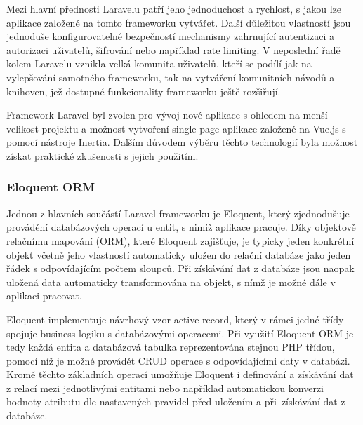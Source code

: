 Mezi hlavní přednosti Laravelu patří jeho jednoduchost a rychlost, s jakou lze aplikace založené na tomto frameworku vytvářet. Další důležitou vlastností jsou jednoduše konfigurovatelné bezpečností mechanismy zahrnující autentizaci a autorizaci uživatelů, šifrování nebo například rate limiting. V neposlední řadě kolem Laravelu vznikla velká komunita uživatelů, kteří se podílí jak na vylepšování samotného frameworku, tak na vytváření komunitních návodů a knihoven, jež dostupné funkcionality frameworku ještě rozšiřují. \cite{laravel-docs, symfony-laravel-comparison-1}

Framework Laravel byl zvolen pro vývoj nové aplikace s ohledem na menší velikost projektu a možnost vytvoření single page aplikace založené na Vue.js s pomocí nástroje Inertia. Dalším důvodem výběru těchto technologií byla možnost získat praktické zkušenosti s jejich použitím.

\subsubsection{Eloquent ORM}
Jednou z hlavních součástí Laravel frameworku je Eloquent, který zjednodušuje provádění databázových operací u entit, s nimiž aplikace pracuje. Díky objektově relačnímu mapování (ORM), které Eloquent zajišťuje, je typicky jeden konkrétní objekt včetně jeho vlastností automaticky uložen do relační databáze jako jeden řádek s odpovídajícím počtem sloupců. Při získávání dat z databáze jsou naopak uložená data automaticky transformována na objekt, s nímž je možné dále v aplikaci pracovat.

Eloquent implementuje návrhový vzor active record, který v rámci jedné třídy spojuje business logiku s databázovými operacemi. Při využití Eloquent ORM je tedy každá entita a databázová tabulka reprezentována stejnou PHP třídou, pomocí níž je možné provádět CRUD operace s odpovídajícími daty v databázi. Kromě těchto základních operací umožňuje Eloquent i definování a získávání dat z relací mezi jednotlivými entitami nebo například automatickou konverzi hodnoty atributu dle nastavených pravidel před uložením a při~získávání dat z databáze. \cite{laravel-eloquent}

%

